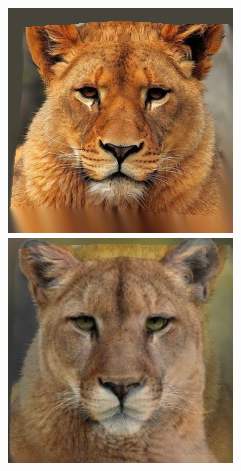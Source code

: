 \documentclass[conference]{IEEEtran}
\begin{document}
\begin{figure}[H]
\begin{multicols}{3}
    \centering
    \includegraphics[width=1.0\linewidth]{results/cats/XL/img01.png} \par
    \includegraphics[width=1.0\linewidth]{results/cats/XL/img30.png} \par
    

\end{multicols}
\end{figure}
\end{document}
